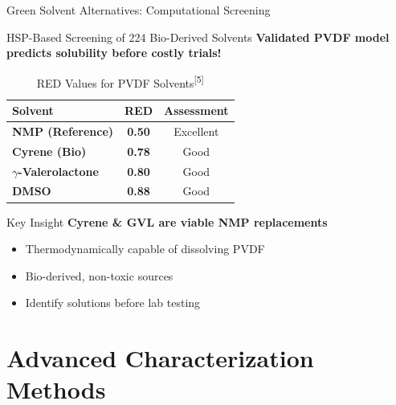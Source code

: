\documentclass[aspectratio=169]{beamer}
\begin{document}
\begin{frame}{Green Solvent Alternatives: Computational Screening}
    \begin{block}{HSP-Based Screening of 224 Bio-Derived Solvents}
        \small \textbf{Validated PVDF model predicts solubility before costly trials!}
    \end{block}
    
    \vspace{-0.2cm}
    \begin{table}
        \caption{RED Values for PVDF Solvents\textsuperscript{[5]}}
        \centering\footnotesize
        \begin{tabular}{lcc}
            \toprule
            \textbf{Solvent} & \textbf{RED} & \textbf{Assessment} \\
            \midrule
            \textbf{NMP (Reference)} & \textcolor{HighlightGreen}{\textbf{0.50}} & Excellent \\
            \textbf{Cyrene (Bio)} & \textcolor{HighlightGreen}{\textbf{0.78}} & Good \\
            \textbf{$\gamma$-Valerolactone} & \textcolor{HighlightGreen}{\textbf{0.80}} & Good \\
            \textbf{DMSO} & \textcolor{HighlightGreen}{\textbf{0.88}} & Good \\
            \bottomrule
        \end{tabular}
    \end{table}
    
    \vspace{-0.2cm}
    \begin{alertblock}{Key Insight}
        \small \textbf{Cyrene \& GVL are viable NMP replacements}
        \begin{itemize}\footnotesize
            \item Thermodynamically capable of dissolving PVDF
            \item Bio-derived, non-toxic sources
            \item Identify solutions before lab testing
        \end{itemize}
    \end{alertblock}
\end{frame}

\section{Advanced Characterization Methods}
\end{document}
